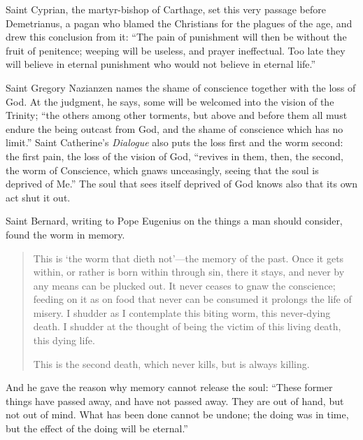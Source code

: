 Saint Cyprian, the martyr-bishop of Carthage, set this very passage before Demetrianus, a pagan who blamed the Christians for the plagues of the age, and drew this conclusion from it: ``The pain of punishment will then be without the fruit of penitence; weeping will be useless, and prayer ineffectual. Too late they will believe in eternal punishment who would not believe in eternal life.''

Saint Gregory Nazianzen names the shame of conscience together with the loss of God. At the judgment, he says, some will be welcomed into the vision of the Trinity; ``the others among other torments, but above and before them all must endure the being outcast from God, and the shame of conscience which has no limit.'' Saint Catherine's \emph{Dialogue} also puts the loss first and the worm second: the first pain, the loss of the vision of God, ``revives in them, then, the second, the worm of Conscience, which gnaws unceasingly, seeing that the soul is deprived of Me.'' The soul that sees itself deprived of God knows also that its own act shut it out.

Saint Bernard, writing to Pope Eugenius on the things a man should consider, found the worm in memory.

\begin{quote}
This is `the worm that dieth not'---the memory of the past. Once it gets within, or rather is born within through sin, there it stays, and never by any means can be plucked out. It never ceases to gnaw the conscience; feeding on it as on food that never can be consumed it prolongs the life of misery. I shudder as I contemplate this biting worm, this never-dying death. I shudder at the thought of being the victim of this living death, this dying life.

This is the second death, which never kills, but is always killing.
\end{quote}

\noindent And he gave the reason why memory cannot release the soul: ``These former things have passed away, and have not passed away. They are out of hand, but not out of mind. What has been done cannot be undone; the doing was in time, but the effect of the doing will be eternal.''


